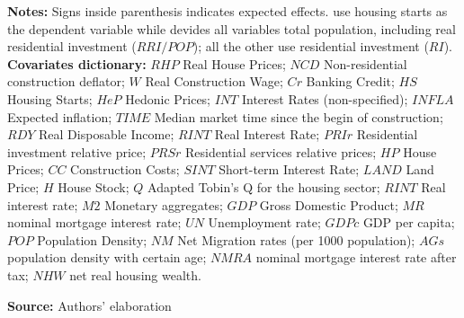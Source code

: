 \begin{table}[htb]
\begin{threeparttable}
    \footnotesize{\textbf{Notes:} Signs inside parenthesis indicates expected effects. \textcite{topel_1988_Housing} use housing starts as the dependent variable while \textcite{fair_macroeconometric_2018} devides all variables total population, including real residential investment ($RRI/POP$); all the other use residential investment ($RI$). \textbf{Covariates dictionary:} $RHP$ Real House Prices; $NCD$ Non-residential construction deflator; $W$ Real Construction Wage; $Cr$ Banking Credit; $HS$ Housing Starts; $HeP$ Hedonic Prices; $INT$ Interest Rates (non-specified); $INFLA$ Expected inflation; $TIME$ Median market time since the begin of construction; $RDY$ Real Disposable Income; $RINT$ Real Interest Rate; $PRIr$ Residential investment relative price; $PRSr$ Residential services relative prices; $HP$ House Prices; $CC$ Construction Costs; $SINT$ Short-term Interest Rate; $LAND$ Land Price; $H$ House Stock; $Q$ Adapted Tobin's Q for the housing sector; $RINT$ Real interest rate; $M2$ Monetary aggregates; $GDP$ Gross Domestic Product; $MR$ nominal mortgage interest rate; $UN$ Unemployment rate; $GDPc$ GDP per capita; $POP$ Population Density; $NM$ Net Migration rates (per 1000 population); $AGs$ population density with certain age; $NMRA$ nominal mortgage interest rate after tax; $NHW$ net real housing wealth.}
  \end{threeparttable}
    \caption*{\textbf{Source:} Authors' elaboration}
\end{table}
